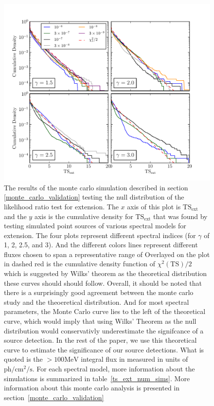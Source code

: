 \documentclass[preprint]{aastex}
\newcommand{\mev}{\text{MeV}\xspace}
\newcommand{\s}{\text{s}\xspace}
\newcommand{\ph}{\text{ph}\xspace}
\newcommand{\cm}{\text{cm}\xspace}
\newcommand{\tsext}{{\ensuremath{\text{TS}_\text{ext}}}\xspace}
\newcommand{\ts}{\text{TS}\xspace}
\begin{document}
\clearpage
\begin{figure}
  \begin{center}
    \includegraphics{mc_plots/ts_ext_emin_1000.pdf}
    \end{center}
    \caption{
    The results of the monte carlo simulation described in section
    \ref{monte_carlo_validation} testing the null distribution of
    the likelihood ratio test for extension.  The $x$ axis of this
    plot is \tsext and the $y$ axis is the cumulative density for
    \tsext that was found by testing simulated point sources of
    various spectral models for extension. The four plots represent
    different spectral indices (for $\gamma$ of 1, 2, 2.5, and 3).
    And the different colors lines represent different fluxes chosen
    to span a representative range of Overlayed on the plot in dashed
    red is the cumulative density function of $\chi^2(\ts)/2$ which is
    suggested by Wilks' theorem as the theoretical distribution these
    curves should should follow.  Overall, it should be noted that there
    is a surprisingly good agreement between the monte carlo study and
    the theoeretical distribution. And for most spectral parameters, the
    Monte Carlo curve lies to the left of the theoretical curve, which
    would imply that using Wilks' Theorem as the null distribution would
    conservativly underestimate the signifcance of a source detection. In
    the rest of the paper, we use this theoretical curve to estimate
    the significance of our source detections.  What is quoted is the
    $>100\mev$ integral flux in measured in units of $\ph/\cm^2/\s$.
    For each spectral model, more information about the simulations is
    summarized in table~\ref{ts_ext_num_sims}. More
    information about this monte carlo analysis is presented in
    section~\ref{monte_carlo_validation}
    }\label{ts_ext_mc}
  \end{figure}
\end{document}
